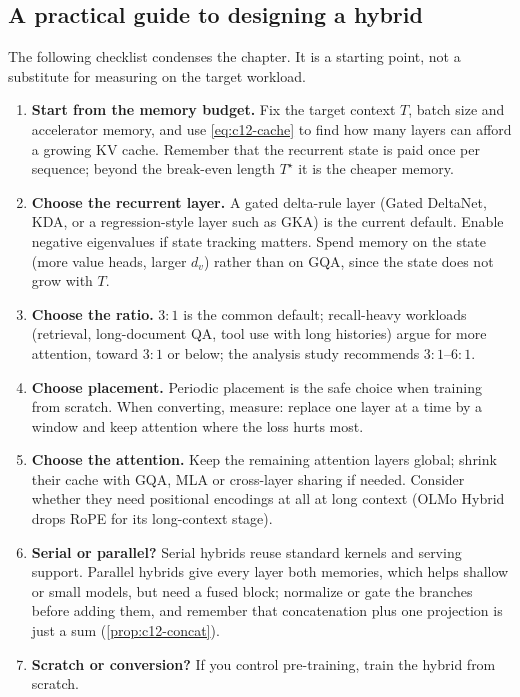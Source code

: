 \subsection{A practical guide to designing a hybrid}\label{sec:c12-guide}

The following checklist condenses the chapter. It is a starting point, not a substitute for
measuring on the target workload.
\begin{enumerate}
  \item \textbf{Start from the memory budget.} Fix the target context $T$, batch size and
  accelerator memory, and use \eqref{eq:c12-cache} to find how many layers can afford a growing KV
  cache. Remember that the recurrent state is paid once per sequence; beyond the break-even length
  $T^\star$ it is the cheaper memory.
  \item \textbf{Choose the recurrent layer.} A gated delta-rule layer (Gated DeltaNet, KDA, or a
  regression-style layer such as GKA) is the current default. Enable negative eigenvalues if state
  tracking matters. Spend memory on the state (more value heads, larger $d_v$) rather than on GQA,
  since the state does not grow with $T$.
  \item \textbf{Choose the ratio.} $3{:}1$ is the common default; recall-heavy workloads (retrieval,
  long-document QA, tool use with long histories) argue for more attention, toward $3{:}1$ or
  below; the analysis study recommends $3{:}1$--$6{:}1$.
  \item \textbf{Choose placement.} Periodic placement is the safe choice when training from
  scratch. When converting, measure: replace one layer at a time by a window and keep attention
  where the loss hurts most.
  \item \textbf{Choose the attention.} Keep the remaining attention layers global; shrink their
  cache with GQA, MLA or cross-layer sharing if needed. Consider whether they need positional
  encodings at all at long context (OLMo Hybrid drops RoPE for its long-context stage).
  \item \textbf{Serial or parallel?} Serial hybrids reuse standard kernels and serving support.
  Parallel hybrids give every layer both memories, which helps shallow or small models, but need a
  fused block; normalize or gate the branches before adding them, and remember that concatenation
  plus one projection is just a sum (\cref{prop:c12-concat}).
  \item \textbf{Scratch or conversion?} If you control pre-training, train the hybrid from scratch.

\end{enumerate}
